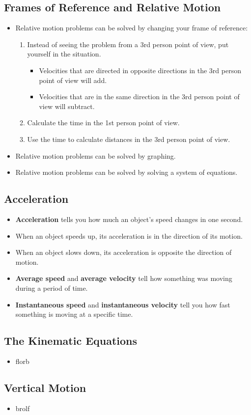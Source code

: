 \documentclass[letterpaper, 12pt]{article}
\begin{document}
\subsection*{Frames of Reference and Relative Motion}
\begin{itemize}
	\item Relative motion problems can be solved by changing your frame of reference:
		\begin{enumerate} 
			\item Instead of seeing the problem from a 3rd person point of view, put yourself in the situation.
				\begin{itemize}
					\item Velocities that are directed in opposite directions in the 3rd person point of view will add.
					\item Velocities that are in the same direction in the 3rd person point of view will subtract.
				\end{itemize}
			\item Calculate the time in the 1st person point of view.
			\item Use the time to calculate distances in the 3rd person point of view.
			
		\end{enumerate}
	\item Relative motion problems can be solved by graphing.
	\item Relative motion problems can be solved by solving a system of equations.
	
	
\end{itemize}

	
\subsection*{Acceleration}
\begin{itemize}
	\item \textbf{Acceleration} tells you how much an object's speed changes in one second.
	\item When an object speeds up, its acceleration is in the direction of its motion.
	\item When an object slows down, its acceleration is opposite the direction of motion.
	\item \textbf{Average speed} and \textbf{average velocity} tell how something was moving during a period of time.
	\item \textbf{Instantaneous speed} and \textbf{instantaneous velocity} tell you how fast something is moving at a specific time.
	
\end{itemize}

\subsection*{The Kinematic Equations}
\begin{itemize}
	\item florb
	
\end{itemize}

\subsection*{Vertical Motion}
\begin{itemize}
	\item brolf
	
\end{itemize}
 
\end{document}
